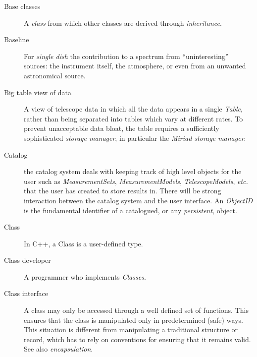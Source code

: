\begin{description}
\item[Base classes]
A {\em class} from which other classes are derived through {\em
inheritance}.

\item[Baseline] For {\em single dish} the contribution to a spectrum
from ``uninteresting'' sources: the instrument itself, the atmosphere,
or even from an unwanted astronomical source.


\item[Big table view of data]
A view of telescope data in which all the data appears in a single
{\em Table}, rather than being separated into tables which vary at
different rates. To prevent unacceptable data bloat, the table
requires a sufficiently sophisticated {\em storage manager}, in
particular the {\em Miriad storage manager}.

\item[Catalog] the catalog system deals with keeping track of high
level objects for the user such as {\em MeasurementSets}, {\em
MeasurementModels}, {\em TelescopeModels}, {\em etc.} that the user
has created to store results in.  There will be strong interaction
between the catalog system and the user interface. An {\em ObjectID}
is the fundamental identifier of a catalogued, or any {\em
persistent}, object.

\item[Class] In C++, a Class is a user-defined type. 


\item[Class developer] A programmer who implements {\em
Classes}.


\item[Class interface] A class may only be accessed through a well
defined set of functions. This ensures that the class is manipulated
only in predetermined (safe) ways. This situation is different from
manipulating a traditional structure or record, which has to rely on
conventions for ensuring that it remains valid. See also {\em
encapsulation}.



\end{description}
